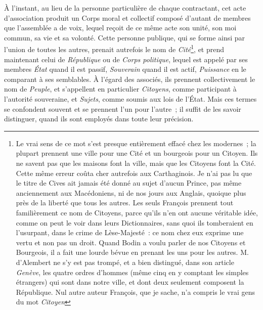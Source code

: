 \documentclass[french,twoside]{book} %
\begin{document}
À l’instant, au lieu de la personne particulière de chaque contractant, cet acte d’association produit un Corps moral et collectif composé d’autant de membres que l’assemblée a de voix, lequel reçoit de ce même acte son unité, son moi commun, sa vie et sa volonté. Cette personne publique, qui se forme ainsi par l’union de toutes les autres, prenait autrefois le nom de {\itshape Cité}\footnote{Le vrai sens de ce mot s’est presque entièrement effacé chez les modernes ; la plupart prennent une ville pour une Cité et un bourgeois pour un Citoyen. Ils ne savent pas que les maisons font la ville, mais que les Citoyens font la Cité. Cette même erreur coûta cher autrefois aux Carthaginois. Je n’ai pas lu que le titre de Cives ait jamais été donné au sujet d’aucun Prince, pas même anciennement aux Macédoniens, ni de nos jours aux Anglais, quoique plus près de la liberté que tous les autres. Les seuls François prennent tout familièrement ce nom de Citoyens, parce qu’ils n’en ont aucune véritable idée, comme on peut le voir dans leurs Dictionnaires, sans quoi ils tomberaient en l’usurpant, dans le crime de Lèse-Majesté : ce nom chez eux exprime une vertu et non pas un droit. Quand Bodin a voulu parler de nos Citoyens et Bourgeois, il a fait une lourde bévue en prenant les uns pour les autres. M. d’Alembert ne s’y est pas trompé, et a bien distingué, dans son article {\itshape Genève}, les quatre ordres d’hommes (même cinq en y comptant les simples étrangers) qui sont dans notre ville, et dont deux seulement composent la République. Nul autre auteur François, que je sache, n’a compris le vrai gens du mot {\itshape Citoyen}}, et prend maintenant celui de {\itshape République} ou de {\itshape Corps politique}, lequel est appelé par ses membres {\itshape État} quand il est passif, {\itshape Souverain} quand il est actif, {\itshape Puissance} en le comparant à ses semblables. À l’égard des associés, ils prennent collectivement le nom de {\itshape Peuple}, et s’appellent en particulier {\itshape Citoyens}, comme participant à l’autorité souveraine, et {\itshape Sujets}, comme soumis aux lois de l’État. Mais ces termes se confondent souvent et se prennent l’un pour l’autre ; il suffit de les savoir distinguer, quand ils sont employés dans toute leur précision.
\end{document}
